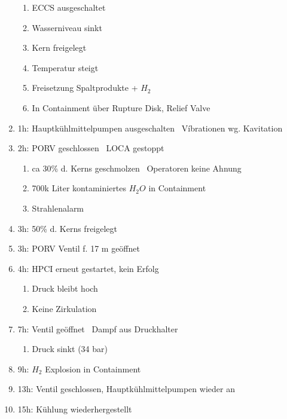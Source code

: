 \documentclass[12pt]{article}
\begin{document}
\begin{enumerate}
  \begin{enumerate}[label = \textrightarrow]
    \item ECCS ausgeschaltet
    \item Wasserniveau sinkt
    \item Kern freigelegt
    \item Temperatur steigt
    \item Freisetzung Spaltprodukte + \(H_2\)
    \item In Containment über Rupture Disk, Relief Valve
  \end{enumerate}
  \item 1h: Hauptkühlmittelpumpen ausgeschalten \textrightarrow\ Víbrationen wg. Kavitation
  \item 2h: PORV geschlossen \textrightarrow\ LOCA gestoppt
  \begin{enumerate}[label = \textrightarrow]
    \item ca 30\% d. Kerns geschmolzen \textrightarrow\ Operatoren keine Ahnung
    \item 700k Liter kontaminiertes \(H_2O\) in Containment
    \item Strahlenalarm
  \end{enumerate}
  \item 3h: 50\% d. Kerns freigelegt
  \item 3h: PORV Ventil f. 17 m geöffnet
  \item 4h: HPCI erneut gestartet, kein Erfolg
  \begin{enumerate}[label = \textrightarrow]
    \item Druck bleibt hoch
    \item Keine Zirkulation
  \end{enumerate}
  \item 7h: Ventil geöffnet \textrightarrow\ Dampf aus Druckhalter
  \begin{enumerate}[label = \textrightarrow]
    \item Druck sinkt (34 bar)
  \end{enumerate}
  \item 9h: \(H_2\) Explosion in Containment
  \item 13h: Ventil geschlossen, Hauptkühlmittelpumpen wieder an
  \item 15h: Kühlung wiederhergestellt
\end{enumerate}
\end{document}
